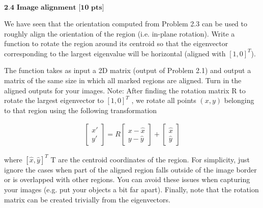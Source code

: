 \documentclass[11pt]{article}
\begin{document}
    \(\textbf{2.4 Image alignment [10 pts]}\)

We have seen that the orientation computed from Problem 2.3 can be used
to roughly align the orientation of the region (i.e. in-plane rotation).
Write a function to rotate the region around its centroid so that the
eigenvector corresponding to the largest eigenvalue will be horizontal
(aligned with \([1, 0]^T\)).

The function takes as input a 2D matrix (output of Problem 2.1) and
output a matrix of the same size in which all marked regions are
aligned. Turn in the aligned outputs for your images. Note: After
finding the rotation matrix R to rotate the largest eigenvector to
\([1, 0]^T\) , we rotate all points \((x, y)\) belonging to that region
using the following transformation

\begin{eqnarray}
\begin{bmatrix}x'\\y'
\end{bmatrix}=R\begin{bmatrix}x-\hat{x}\\y-\hat{y}
\end{bmatrix}+\begin{bmatrix}\hat{x}\\\hat{y}
\end{bmatrix}
\end{eqnarray}

where \([\hat{x}, \hat{y}]^T\) T are the centroid coordinates of the
region. For simplicity, just ignore the cases when part of the aligned
region falls outside of the image border or is overlapped with other
regions. You can avoid these issues when capturing your images (e.g. put
your objects a bit far apart). Finally, note that the rotation matrix
can be created trivially from the eigenvectors.
\end{document}
